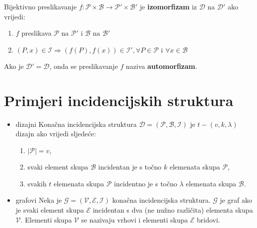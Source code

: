 \noindent
Bijektivno preslikavanje
$f: \mathcal{P} \times \mathcal{B} \to \mathcal{P}' \times \mathcal{B}'$ je
\textbf{izomorfizam} iz $\mathcal{D}$ na $\mathcal{D}'$ ako vrijedi:
\begin{enumerate}
    \item $f$ preslikava $\mathcal{P}$ na $\mathcal{P}'$ i $\mathcal{B}$ na $\mathcal{B}'$
    \item $(P, x) \in \mathcal{I} \Rightarrow (f (P), f (x)) \in \mathcal{I}', \forall P \in \mathcal{P}\text{ i }\forall x \in \mathcal{B}$
\end{enumerate}

Ako je $\mathcal{D}' = \mathcal{D}$, onda se preslikavanje $f$ naziva
\textbf{automorfizam}.

\section{Primjeri incidencijskih struktura}

\begin{itemize}
    \item dizajni\newline
    Konačna incidencijska struktura
    $\mathcal{D} = (\mathcal{P}, \mathcal{B}, \mathcal{I})$ je
    $t - (v, k, \lambda)$ dizajn ako vrijedi sljedeće:
    \begin{enumerate}
        \item $|\mathcal{P}| = v$,
        \item svaki element skupa $\mathcal{B}$ incidentan je s točno $k$
        elemenata skupa $\mathcal{P}$,
        \item svakih $t$ elemenata skupa $\mathcal{P}$ incidentno je s točno
        $\lambda$ elemenata skupa $\mathcal{B}$.
    \end{enumerate}
    \item grafovi\newline
    Neka je $\mathcal{G} = (\mathcal{V}, \mathcal{E}, \mathcal{I})$ konačna
    incidencijska struktura. $\mathcal{G}$ je graf ako je svaki element skupa
    $\mathcal{E}$ incidentan s dva (ne nužno različita) elementa skupa
    $\mathcal{V}$. Elementi skupa $\mathcal{V}$ se nazivaju vrhovi i elementi
    skupa $\mathcal{E}$ bridovi.
\end{itemize}
